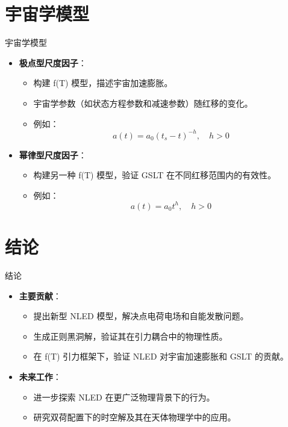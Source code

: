 \documentclass{beamer}
\begin{document}
\section{宇宙学模型}
\begin{frame}{宇宙学模型}
\begin{itemize}
    \item \textbf{极点型尺度因子}：
    \begin{itemize}
        \item 构建 f(T) 模型，描述宇宙加速膨胀。
        \item 宇宙学参数（如状态方程参数和减速参数）随红移的变化。
        \item 例如：
        \[
        a(t) = a_0 (t_s - t)^{-h}, \quad h > 0
        \]
    \end{itemize}
    \item \textbf{幂律型尺度因子}：
    \begin{itemize}
        \item 构建另一种 f(T) 模型，验证 GSLT 在不同红移范围内的有效性。
        \item 例如：
        \[
        a(t) = a_0 t^h, \quad h > 0
        \]
    \end{itemize}
\end{itemize}
\end{frame}

\section{结论}
\begin{frame}{结论}
\begin{itemize}
    \item \textbf{主要贡献}：
    \begin{itemize}
        \item 提出新型 NLED 模型，解决点电荷电场和自能发散问题。
        \item 生成正则黑洞解，验证其在引力耦合中的物理性质。
        \item 在 f(T) 引力框架下，验证 NLED 对宇宙加速膨胀和 GSLT 的贡献。
    \end{itemize}
    \item \textbf{未来工作}：
    \begin{itemize}
        \item 进一步探索 NLED 在更广泛物理背景下的行为。
        \item 研究双荷配置下的时空解及其在天体物理学中的应用。
    \end{itemize}
\end{itemize}
\end{frame}
\end{document}

